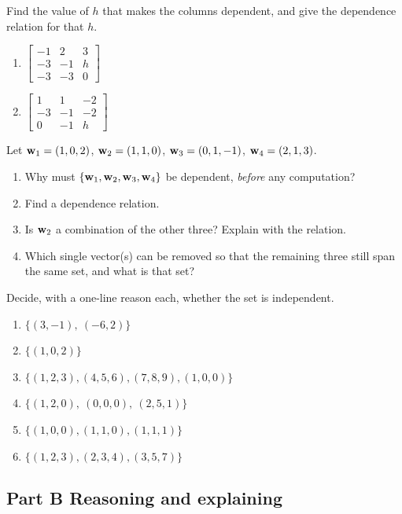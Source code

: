\documentclass[11pt]{article}
\begin{document}
\problem[Parameters.]
Find the value of $h$ that makes the columns dependent, and give the dependence relation for that $h$.
\begin{enumerate}
  \item $\begin{bmatrix}-1&2&3\\-3&-1&h\\-3&-3&0\end{bmatrix}$
  \item $\begin{bmatrix}1&1&-2\\-3&-1&-2\\0&-1&h\end{bmatrix}$
\end{enumerate}

Let $\mathbf{w}_1=(1,0,2)$, $\mathbf{w}_2=(1,1,0)$, $\mathbf{w}_3=(0,1,-1)$, $\mathbf{w}_4=(2,1,3)$.
\begin{enumerate}
  \item Why must $\{\mathbf{w}_1,\mathbf{w}_2,\mathbf{w}_3,\mathbf{w}_4\}$ be dependent, \emph{before} any computation?
  \item Find a dependence relation.
  \item Is $\mathbf{w}_2$ a combination of the other three? Explain with the relation.
  \item Which single vector(s) can be removed so that the remaining three still span the same set, and what is that set?
\end{enumerate}

\problem[By inspection.]
Decide, with a one-line reason each, whether the set is independent.
\begin{enumerate}
  \item $\{(3,-1),\ (-6,2)\}$
  \item $\{(1,0,2)\}$
  \item $\{(1,2,3),(4,5,6),(7,8,9),(1,0,0)\}$
  \item $\{(1,2,0),\ (0,0,0),\ (2,5,1)\}$
  \item $\{(1,0,0),(1,1,0),(1,1,1)\}$
  \item $\{(1,2,3),(2,3,4),(3,5,7)\}$
\end{enumerate}

\subsection*{Part B \quad Reasoning and explaining}
\end{document}
